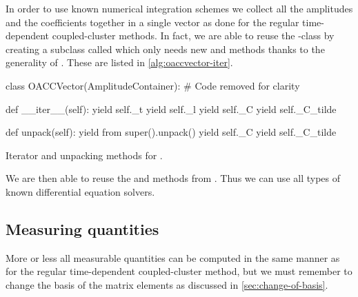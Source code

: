             In order to use known numerical integration schemes we collect all
            the amplitudes and the coefficients together in a single vector
            as done for the regular time-dependent coupled-cluster methods.
            In fact, we are able to reuse the -class by
            creating a subclass called  which only needs new
             and  methods thanks to the generality
            of .
            These are listed in \autoref{alg:oaccvector-iter}.
            \begin{algorithm}
                \begin{python}
class OACCVector(AmplitudeContainer):
    # Code removed for clarity

    def __iter__(self):
        yield self._t
        yield self._l
        yield self._C
        yield self._C_tilde

    def unpack(self):
        yield from super().unpack()
        yield self._C
        yield self._C_tilde
                \end{python}
                \caption{Iterator and unpacking methods for .}
                \label{alg:oaccvector-iter}
            \end{algorithm}
            We are then able to reuse the  and 
            methods from .
            Thus we can use all types of known differential equation solvers.

        \subsection{Measuring quantities}
            More or less all measurable quantities can be computed in the same
            manner as for the regular time-dependent coupled-cluster method, but
            we must remember to change the basis of the matrix elements as
            discussed in \autoref{sec:change-of-basis}.

